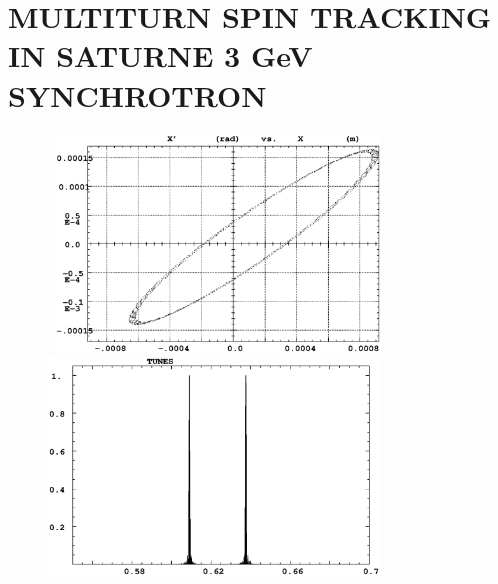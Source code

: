  \clearpage

\section{MULTITURN SPIN TRACKING IN SATURNE 3 GeV SYNCHROTRON}

\begin{figure}[H]
\begin{center}


\vspace{-5mm}

\mbox{
\includegraphics[height=5.8cm]{FigC6-2a.ps}
\includegraphics[height=5.8cm]{FigC6-2b.ps} 
}


\end{center}
\end{figure}
